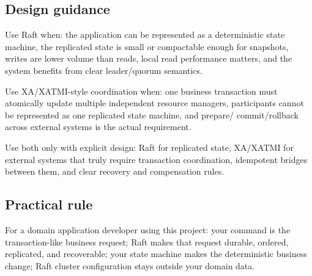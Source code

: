 \subsection{Design guidance}

Use Raft when: the application can be represented as a deterministic state
machine, the replicated state is small or compactable enough for
snapshots, writes are lower volume than reads, local read performance
matters, and the system benefits from clear leader/quorum semantics.

Use XA/XATMI-style coordination when: one business transaction must
atomically update multiple independent resource managers, participants
cannot be represented as one replicated state machine, and prepare/
commit/rollback across external systems is the actual requirement.

Use both only with explicit design: Raft for replicated state, XA/XATMI
for external systems that truly require transaction coordination,
idempotent bridges between them, and clear recovery and compensation
rules.

\subsection{Practical rule}

For a domain application developer using this project: your command is the
transaction-like business request; Raft makes that request durable,
ordered, replicated, and recoverable; your state machine makes the
deterministic business change; Raft cluster configuration stays outside
your domain data.
